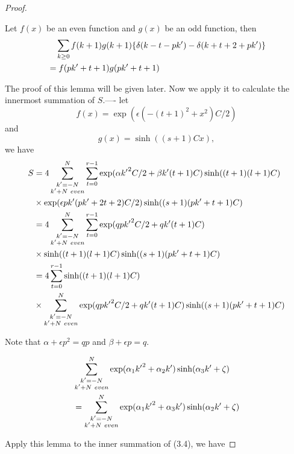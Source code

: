 \begin{proof}
\begin{lemma}
Let $f(x)$ be an even function and $g(x)$ be an odd function, then
\begin{align} &\quad\sum_{k\ge 0}f(k+1)g(k+1)\{\delta(k-t-pk')-\delta(k+t+2+pk')\}\notag\\
&=f(pk'+t+1)g(pk'+t+1)\notag\end{align}
\end{lemma}

The proof of this lemma will be given later. Now we apply it to
calculate the innermost summation of $S$.---- let
\[f(x)=\exp(\epsilon(-(t+1)^2+x^2)C/2)\] and \[g(x)=\sinh((s+1)Cx),\] we
have
\begin{align}
S&=4\sum_{ \substack {k'=-N\\ k'+N\ even}}^N \sum_{t=0}^{r-1}\exp(\alpha {k'}^2C/2+\beta
k'(t+1)C)\sinh((t+1)(l+1)C)\notag\\
&\times\exp(\epsilon pk'(pk'+2t+2)C/2)\sinh((s+1)(pk'+t+1)C)\notag\\
&=4\sum_{ \substack {k'=-N\\ k'+N\ even}}^N \sum_{t=0}^{r-1}\exp(qp{k'}^2C/2+qk'(t+1)C)\notag\\
&\times \sinh((t+1)(l+1)C)\sinh((s+1)(pk'+t+1)C)\notag\\
&=4\sum_{t=0}^{r-1}\sinh((t+1)(l+1)C)\notag\\
&\times\sum_{ \substack {k'=-N\\ k'+N\ even}}^N \exp(qp{k'}^2C/2+qk'(t+1)C)\sinh((s+1)(pk'+t+1)C)\notag\end{align}

Note that $\alpha+\epsilon p^2=qp$ and $\beta+\epsilon p=q$.

\begin{lemma}
\begin{align} &\sum_{ \substack {k'=-N\\ k'+N\ even}}^N \exp(\alpha_1{k'}^2+\alpha_2k')\sinh(\alpha_3k'+\zeta)\notag\\
&=\sum_{ \substack {k'=-N\\ k'+N\ even}}^N \exp(\alpha_1{k'}^2+\alpha_3k')\sinh(\alpha_2k'+\zeta)\notag\end{align}
\end{lemma}

Apply this lemma to the inner summation of (3.4), we have


\end{proof}
